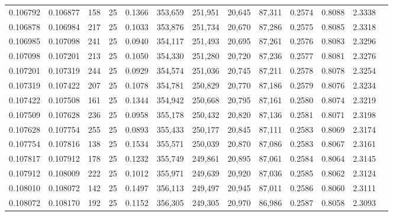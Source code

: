 \begin{tabular}{rrrrrrrrrrrrr}
0.106792 & 0.106877 &   158 &  25 &                                     0.1366 & 353,659 & 251,951 &  20,645 &  87,311 & 0.2574 & 0.8088 & 2.3338 \\
0.106878 & 0.106984 &   217 &  25 &                                     0.1033 & 353,876 & 251,734 &  20,670 &  87,286 & 0.2575 & 0.8085 & 2.3318 \\
0.106985 & 0.107098 &   241 &  25 &                                     0.0940 & 354,117 & 251,493 &  20,695 &  87,261 & 0.2576 & 0.8083 & 2.3296 \\
0.107098 & 0.107201 &   213 &  25 &                                     0.1050 & 354,330 & 251,280 &  20,720 &  87,236 & 0.2577 & 0.8081 & 2.3276 \\
0.107201 & 0.107319 &   244 &  25 &                                     0.0929 & 354,574 & 251,036 &  20,745 &  87,211 & 0.2578 & 0.8078 & 2.3254 \\
0.107319 & 0.107422 &   207 &  25 &                                     0.1078 & 354,781 & 250,829 &  20,770 &  87,186 & 0.2579 & 0.8076 & 2.3234 \\
0.107422 & 0.107508 &   161 &  25 &                                     0.1344 & 354,942 & 250,668 &  20,795 &  87,161 & 0.2580 & 0.8074 & 2.3219 \\
0.107509 & 0.107628 &   236 &  25 &                                     0.0958 & 355,178 & 250,432 &  20,820 &  87,136 & 0.2581 & 0.8071 & 2.3198 \\
0.107628 & 0.107754 &   255 &  25 &                                     0.0893 & 355,433 & 250,177 &  20,845 &  87,111 & 0.2583 & 0.8069 & 2.3174 \\
0.107754 & 0.107816 &   138 &  25 &                                     0.1534 & 355,571 & 250,039 &  20,870 &  87,086 & 0.2583 & 0.8067 & 2.3161 \\
0.107817 & 0.107912 &   178 &  25 &                                     0.1232 & 355,749 & 249,861 &  20,895 &  87,061 & 0.2584 & 0.8064 & 2.3145 \\
0.107912 & 0.108009 &   222 &  25 &                                     0.1012 & 355,971 & 249,639 &  20,920 &  87,036 & 0.2585 & 0.8062 & 2.3124 \\
0.108010 & 0.108072 &   142 &  25 &                                     0.1497 & 356,113 & 249,497 &  20,945 &  87,011 & 0.2586 & 0.8060 & 2.3111 \\
0.108072 & 0.108170 &   192 &  25 &                                     0.1152 & 356,305 & 249,305 &  20,970 &  86,986 & 0.2587 & 0.8058 & 2.3093 \\

\end{tabular}
